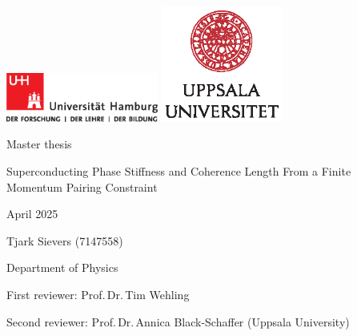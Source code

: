 \documentclass[main.tex]{subfiles}
\begin{document}
\begin{fullsizetitle}
    \vspace{2cm}
    \hspace{0.1\textwidth}
    \vline\hspace{10pt}
    \begin{minipage}[t][0.8\textheight][t]{0.8\textwidth}
        \includegraphics[width=5cm, valign=c]{images/logos/up-uhh-logo-u-2010-u-farbe-u-cmyk}
        \includegraphics[width=4cm, valign=c]{images/logos/UU_logo_CMYK}\par
        \vspace{1\baselineskip}

    \begin{FlushLeft}
        {\Large \textsf{\textcolor{UHHgray}{Master thesis}}\par}

        {\huge \textsf{\textcolor{UHHred}{Superconducting Phase Stiffness and Coherence Length From a Finite Momentum Pairing Constraint}}\par}

       \vspace{1\baselineskip}
       
       \textsf{\textcolor{UHHgray}{April 2025}}

    \end{FlushLeft}

    \vfill
    
    \begin{FlushLeft}
    	Tjark Sievers (7147558)\par
        Department of Physics\par
        First reviewer: Prof.\,Dr.\,Tim Wehling\par
        Second reviewer: Prof.\,Dr.\,Annica Black-Schaffer (Uppsala University)\par
    \end{FlushLeft}
    \end{minipage}
\end{fullsizetitle}
\end{document}
